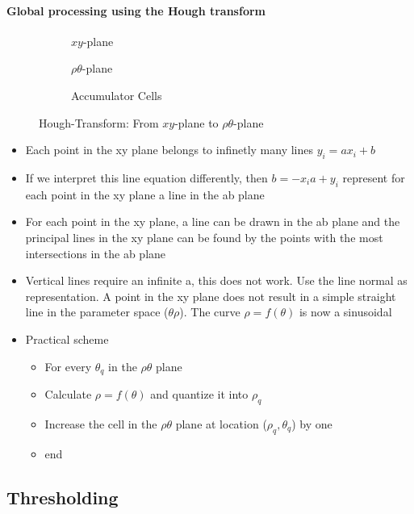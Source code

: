 \paragraph{Global processing using the Hough transform}
\begin{figure}[h]
	\centering
	\begin{subfigure}{0.3\textwidth}
		
		\caption{$xy$-plane}
	\end{subfigure}
	\begin{subfigure}{0.3\textwidth}
		
		\caption{$\rho\theta$-plane}
	\end{subfigure}
	\begin{subfigure}{0.3\textwidth}
		
		\caption{Accumulator Cells}
	\end{subfigure}
	\caption{Hough-Transform: From $xy$-plane to $\rho\theta$-plane}
\end{figure}
\begin{itemize}
\item Each point in the xy plane belongs to infinetly many lines $y_i=ax_i+b$
\item If we interpret this line equation differently, then $b=-x_ia+y_i$ represent for each point in the xy plane a line in the ab plane
\item For each point in the xy plane, a line can be drawn in the ab plane and the principal lines in the xy plane can be found by the points with the most intersections in the ab plane
\item Vertical lines require an infinite a, this does not work. Use the line normal as representation. A point in the xy plane does not result in a simple straight line in the parameter space ($\theta\rho$). The curve $\rho = f(\theta)$ is now a sinusoidal
\item Practical scheme
\begin{itemize}
\item For every $\theta_q$ in the $\rho\theta$ plane
\item Calculate $\rho = f(\theta)$ and quantize it into $\rho_q$
\item Increase the cell in the $\rho\theta$ plane at location ($\rho_q, \theta_q$) by one
\item end
\end{itemize}
\end{itemize}

\subsection{Thresholding}
